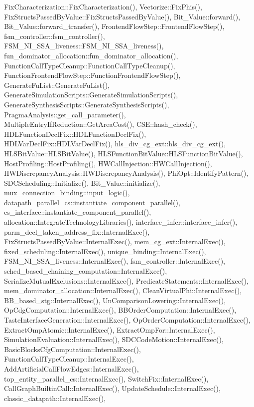 Fix\+Characterization\+::\+Fix\+Characterization(), Vectorize\+::\+Fix\+Phis(), Fix\+Structs\+Passed\+By\+Value\+::\+Fix\+Structs\+Passed\+By\+Value(), Bit\+\_\+\+Value\+::forward(), Bit\+\_\+\+Value\+::forward\+\_\+transfer(), Frontend\+Flow\+Step\+::\+Frontend\+Flow\+Step(), fsm\+\_\+controller\+::fsm\+\_\+controller(), F\+S\+M\+\_\+\+N\+I\+\_\+\+S\+S\+A\+\_\+liveness\+::\+F\+S\+M\+\_\+\+N\+I\+\_\+\+S\+S\+A\+\_\+liveness(), fun\+\_\+dominator\+\_\+allocation\+::fun\+\_\+dominator\+\_\+allocation(), Function\+Call\+Type\+Cleanup\+::\+Function\+Call\+Type\+Cleanup(), Function\+Frontend\+Flow\+Step\+::\+Function\+Frontend\+Flow\+Step(), Generate\+Fu\+List\+::\+Generate\+Fu\+List(), Generate\+Simulation\+Scripts\+::\+Generate\+Simulation\+Scripts(), Generate\+Synthesis\+Scripts\+::\+Generate\+Synthesis\+Scripts(), Pragma\+Analysis\+::get\+\_\+call\+\_\+parameter(), Multiple\+Entry\+If\+Reduction\+::\+Get\+Area\+Cost(), C\+S\+E\+::hash\+\_\+check(), H\+D\+L\+Function\+Decl\+Fix\+::\+H\+D\+L\+Function\+Decl\+Fix(), H\+D\+L\+Var\+Decl\+Fix\+::\+H\+D\+L\+Var\+Decl\+Fix(), hls\+\_\+div\+\_\+cg\+\_\+ext\+::hls\+\_\+div\+\_\+cg\+\_\+ext(), H\+L\+S\+Bit\+Value\+::\+H\+L\+S\+Bit\+Value(), H\+L\+S\+Function\+Bit\+Value\+::\+H\+L\+S\+Function\+Bit\+Value(), Host\+Profiling\+::\+Host\+Profiling(), H\+W\+Call\+Injection\+::\+H\+W\+Call\+Injection(), H\+W\+Discrepancy\+Analysis\+::\+H\+W\+Discrepancy\+Analysis(), Phi\+Opt\+::\+Identify\+Pattern(), S\+D\+C\+Scheduling\+::\+Initialize(), Bit\+\_\+\+Value\+::initialize(), mux\+\_\+connection\+\_\+binding\+::input\+\_\+logic(), datapath\+\_\+parallel\+\_\+cs\+::instantiate\+\_\+component\+\_\+parallel(), cs\+\_\+interface\+::instantiate\+\_\+component\+\_\+parallel(), allocation\+::\+Integrate\+Technology\+Libraries(), interface\+\_\+infer\+::interface\+\_\+infer(), parm\+\_\+decl\+\_\+taken\+\_\+address\+\_\+fix\+::\+Internal\+Exec(), Fix\+Structs\+Passed\+By\+Value\+::\+Internal\+Exec(), mem\+\_\+cg\+\_\+ext\+::\+Internal\+Exec(), fixed\+\_\+scheduling\+::\+Internal\+Exec(), unique\+\_\+binding\+::\+Internal\+Exec(), F\+S\+M\+\_\+\+N\+I\+\_\+\+S\+S\+A\+\_\+liveness\+::\+Internal\+Exec(), fsm\+\_\+controller\+::\+Internal\+Exec(), sched\+\_\+based\+\_\+chaining\+\_\+computation\+::\+Internal\+Exec(), Serialize\+Mutual\+Exclusions\+::\+Internal\+Exec(), Predicate\+Statements\+::\+Internal\+Exec(), mem\+\_\+dominator\+\_\+allocation\+::\+Internal\+Exec(), Clean\+Virtual\+Phi\+::\+Internal\+Exec(), B\+B\+\_\+based\+\_\+stg\+::\+Internal\+Exec(), Un\+Comparison\+Lowering\+::\+Internal\+Exec(), Op\+Cdg\+Computation\+::\+Internal\+Exec(), B\+B\+Order\+Computation\+::\+Internal\+Exec(), Taste\+Interface\+Generation\+::\+Internal\+Exec(), Op\+Order\+Computation\+::\+Internal\+Exec(), Extract\+Omp\+Atomic\+::\+Internal\+Exec(), Extract\+Omp\+For\+::\+Internal\+Exec(), Simulation\+Evaluation\+::\+Internal\+Exec(), S\+D\+C\+Code\+Motion\+::\+Internal\+Exec(), Basic\+Blocks\+Cfg\+Computation\+::\+Internal\+Exec(), Function\+Call\+Type\+Cleanup\+::\+Internal\+Exec(), Add\+Artificial\+Call\+Flow\+Edges\+::\+Internal\+Exec(), top\+\_\+entity\+\_\+parallel\+\_\+cs\+::\+Internal\+Exec(), Switch\+Fix\+::\+Internal\+Exec(), Call\+Graph\+Builtin\+Call\+::\+Internal\+Exec(), Update\+Schedule\+::\+Internal\+Exec(), classic\+\_\+datapath\+::\+Internal\+Exec(), 